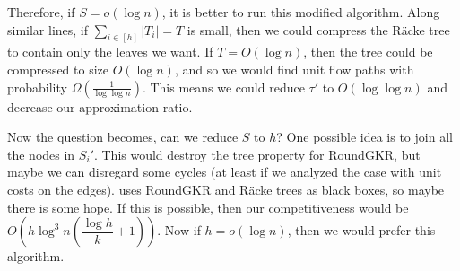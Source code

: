 \documentclass[12pt]{article}
\begin{document}
Therefore, if $S = o(\log n)$, it is better to run this modified algorithm. Along similar lines, if $\sum_{i \in [h]} |T_i| = T$ is small, then we could compress the R\"{a}cke tree to contain only the leaves we want. If $T = O(\log n)$, then the tree could be compressed to size $O(\log n)$, and so we would find unit flow paths with probability $\Omega(\frac{1}{\log \log n})$. This means we could reduce $\tau'$ to $O(\log \log n)$ and decrease our approximation ratio.

Now the question becomes, can we reduce $S$ to $h$? One possible idea is to join all the nodes in $S_i'$. This would destroy the tree property for RoundGKR, but maybe we can disregard some cycles (at least if we analyzed the case with unit costs on the edges). \cite{ssc} uses RoundGKR and R\"{a}cke trees as black boxes, so maybe there is some hope. If this is possible, then our competitiveness would be $O(h\log^3n(\dfrac{\log h}{k} + 1))$. Now if $h = o(\log n)$, then we would prefer this algorithm.



\end{document}
